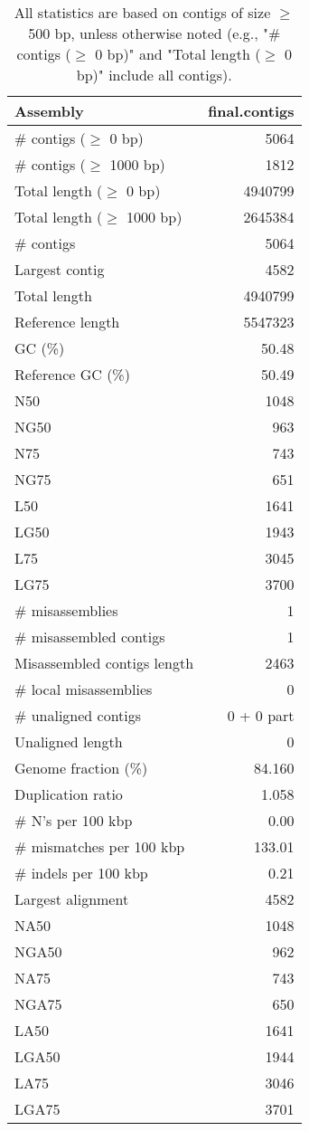 \documentclass[12pt,a4paper]{article}
\begin{document}
\begin{table}[ht]
\begin{center}
\caption{All statistics are based on contigs of size $\geq$ 500 bp, unless otherwise noted (e.g., "\# contigs ($\geq$ 0 bp)" and "Total length ($\geq$ 0 bp)" include all contigs).}
\begin{tabular}{|l*{1}{|r}|}
\hline
Assembly & final.contigs \\ \hline
\# contigs ($\geq$ 0 bp) & 5064 \\ \hline
\# contigs ($\geq$ 1000 bp) & 1812 \\ \hline
Total length ($\geq$ 0 bp) & 4940799 \\ \hline
Total length ($\geq$ 1000 bp) & 2645384 \\ \hline
\# contigs & 5064 \\ \hline
Largest contig & 4582 \\ \hline
Total length & 4940799 \\ \hline
Reference length & 5547323 \\ \hline
GC (\%) & 50.48 \\ \hline
Reference GC (\%) & 50.49 \\ \hline
N50 & 1048 \\ \hline
NG50 & 963 \\ \hline
N75 & 743 \\ \hline
NG75 & 651 \\ \hline
L50 & 1641 \\ \hline
LG50 & 1943 \\ \hline
L75 & 3045 \\ \hline
LG75 & 3700 \\ \hline
\# misassemblies & 1 \\ \hline
\# misassembled contigs & 1 \\ \hline
Misassembled contigs length & 2463 \\ \hline
\# local misassemblies & 0 \\ \hline
\# unaligned contigs & 0 + 0 part \\ \hline
Unaligned length & 0 \\ \hline
Genome fraction (\%) & 84.160 \\ \hline
Duplication ratio & 1.058 \\ \hline
\# N's per 100 kbp & 0.00 \\ \hline
\# mismatches per 100 kbp & 133.01 \\ \hline
\# indels per 100 kbp & 0.21 \\ \hline
Largest alignment & 4582 \\ \hline
NA50 & 1048 \\ \hline
NGA50 & 962 \\ \hline
NA75 & 743 \\ \hline
NGA75 & 650 \\ \hline
LA50 & 1641 \\ \hline
LGA50 & 1944 \\ \hline
LA75 & 3046 \\ \hline
LGA75 & 3701 \\ \hline
\end{tabular}
\end{center}
\end{table}
\end{document}
